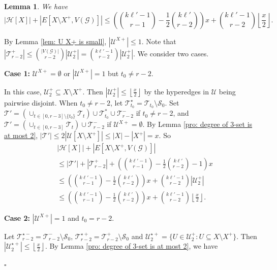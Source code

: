 \documentclass[12pt]{article}%
\newtheorem{lemma}[theorem]{Lemma}
\newenvironment{proof}{{\noindent\it Proof.}}{\hfill $\square$\par}
\newcommand{\mh}{\mathcal{H}}
\newcommand{\mg}{\mathcal{G}}
\newcounter{cases}
\begin{document}
\begin{lemma}\label{lem: U X+ upper}
   We have $$|\mh[X]|+|E[X\setminus X^{+},V(\mg)]|\leq \left(\binom{k\ell'-1}{r-1}-\frac{1}{2}\binom{k\ell'}{r-2}\right)x+\binom{k\ell'-1}{r-2}\left\lfloor\frac{x}{2}\right\rfloor.$$
\end{lemma}
\begin{proof} By Lemma \ref{lem: U X+ is small},
$|\mathcal{U}^{X+}|\leq 1$. Note that $\left|\mathcal{T}_{r-2}^+\right|\leq \binom{|V(\mg)|}{r-2}\left|\mathcal{U}_2^+\right|=\binom{k\ell'-1}{r-2}\left|\mathcal{U}_2^+\right|$.
We consider two cases.

\textbf{Case 1:} $\mathcal{U}^{X+}=\emptyset$ or $|\mathcal{U}^{X+}|= 1$ but $t_0\neq r-2$.

In this case, $\mathcal{U}_2^+\subseteq X\setminus X^{+}$. Then $|\mathcal{U}_{2}^{+}|\leq \left\lfloor\frac{x}{2}\right\rfloor$ by the hyperedges in $\mathcal{U}$ being pairwise disjoint.
When $t_0\neq r-2$, let $\mathcal{T}_{t_0}^\star=\mathcal{T}_{t_0}\setminus\mathcal{S}_0$. Set $\mathcal{T}'=(\cup_{t\in[0,r-3]\setminus\{t_0\}}\mathcal{T}_t)\cup \mathcal{T}_{t_0}^*\cup\mathcal{T}_{r-2}^-$ if $t_0\neq r-2$, and $\mathcal{T}'=(\cup_{t\in[0,r-3]}\mathcal{T}_t)\cup \mathcal{T}_{r-2}^{-}$ if $\mathcal{U}^{X+}=\emptyset$. By Lemma \ref{pro: degree of 3-set is at most 2},  $|\mathcal{T}'|\leq 2|\mathcal{U}[X\setminus X^+]|\leq|X|-|X^+|=x.$ So
\begin{equation*}
    \begin{aligned}
        &|\mh[X]|+|E[X\setminus X^+,V(\mg)]|\\
        &\leq \left|\mathcal{T}'\right|+\left|\mathcal{T}_{r-2}^+\right|+\left(\binom{k\ell'-1}{r-1}-\frac{1}{2}\binom{k\ell'}{r-2}-1\right)x\\
        &\leq  \left(\binom{k\ell'-1}{r-1}-\frac{1}{2}\binom{k\ell'}{r-2}\right)x+\binom{k\ell'-1}{r-2}\left|\mathcal{U}_2^+\right|\\
        &\leq  \left(\binom{k\ell'-1}{r-1}-\frac{1}{2}\binom{k\ell'}{r-2}\right)x+\binom{k\ell'-1}{r-2}\left\lfloor\frac{x}{2}\right\rfloor.
    \end{aligned}
\end{equation*}
\par\noindent
\textbf{Case 2:}
 $|\mathcal{U}^{X+}|= 1$ and $t_0=r-2$.
\par
 Let $\mathcal{T}_{r-2}^{\star-}=\mathcal{T}_{r-2}^-\setminus\mathcal{S}_0$, $\mathcal{T}_{r-2}^{\star+}=\mathcal{T}_{r-2}^+\setminus\mathcal{S}_0$ and $\mathcal{U}_2^{\star+}=\{U\in \mathcal{U}_{2}^{+}: U\subseteq X\setminus X^{+}\}$. Then $|\mathcal{U}_2^{\star +}|\leq \left\lfloor\frac{x}{2}\right\rfloor$.  By Lemma \ref{pro: degree of 3-set is at most 2}, we have

\end{proof}
\end{document}
